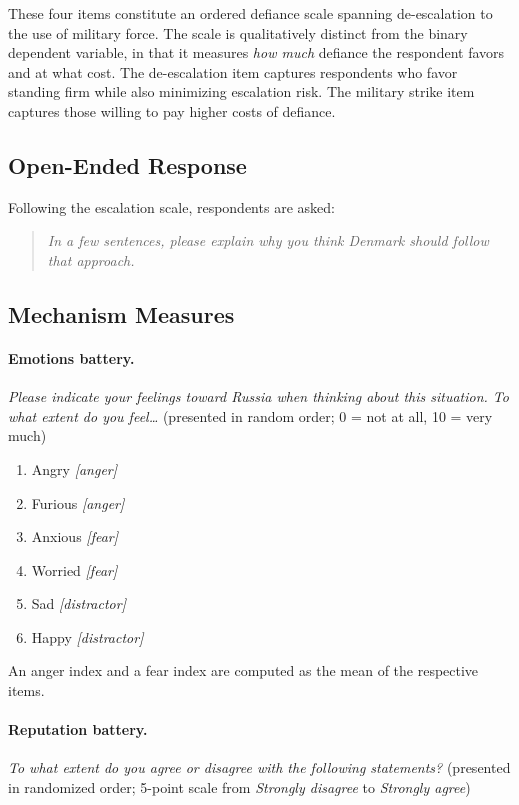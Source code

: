 These four items constitute an ordered defiance scale spanning de-escalation to the use of military force. The scale is qualitatively distinct from the binary dependent variable, in that it measures \textit{how much} defiance the respondent favors and at what cost. The de-escalation item captures respondents who favor standing firm while also minimizing escalation risk. The military strike item captures those willing to pay higher costs of defiance.

\subsection{Open-Ended Response}

Following the escalation scale, respondents are asked:

\begin{quote}
\textit{In a few sentences, please explain why you think Denmark should follow that approach.}
\end{quote}

\subsection{Mechanism Measures}

\paragraph{Emotions battery.}
\textit{Please indicate your feelings toward Russia when thinking about this situation. To what extent do you feel\ldots} (presented in random order; 0 = not at all, 10 = very much)

\begin{enumerate}
    \item Angry \hfill \textit{[anger]}
    \item Furious \hfill \textit{[anger]}
    \item Anxious \hfill \textit{[fear]}
    \item Worried \hfill \textit{[fear]}
    \item Sad \hfill \textit{[distractor]}
    \item Happy \hfill \textit{[distractor]}
\end{enumerate}

An anger index and a fear index are computed as the mean of the respective items.

\paragraph{Reputation battery.}
\textit{To what extent do you agree or disagree with the following statements?} (presented in randomized order; 5-point scale from \textit{Strongly disagree} to \textit{Strongly agree})

